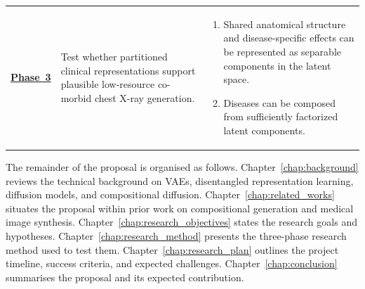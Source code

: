 \begin{table}[htbp]
\begin{tabularx}{\textwidth}{|>{\centering\arraybackslash}m{}|>{\raggedright\arraybackslash}p{}|>{\raggedright\arraybackslash}X|}
\begin{minipage}[t]{\hsize}
        \end{minipage} \\
        \hline
        \hyperref[sec:phase_3]{\textbf{Phase~3}} &
        Test whether partitioned clinical representations support plausible low-resource co-morbid chest X-ray generation. &
        \begin{minipage}[t]{\hsize}
            \vspace{1pt}
            \begin{enumerate}[leftmargin=*, nosep]
                \item Shared anatomical structure and disease-specific effects can be represented as separable components in the latent space.
                \item Diseases can be composed from sufficiently factorized latent components.
            \end{enumerate}
            \vspace{1pt}
        \end{minipage} \\
        \hline
    \end{tabularx}
\end{table}


The remainder of the proposal is organised as follows. Chapter~\ref{chap:background}
reviews the technical background on VAEs, disentangled representation learning, diffusion
models, and compositional diffusion. Chapter~\ref{chap:related_works} situates the
proposal within prior work on compositional generation and medical image synthesis.
Chapter~\ref{chap:research_objectives} states the research goals and hypotheses.
Chapter~\ref{chap:research_method} presents the three-phase research method used to test
them. Chapter~\ref{chap:research_plan} outlines the project timeline, success criteria,
and expected challenges. Chapter~\ref{chap:conclusion} summarises the proposal and its
expected contribution.

